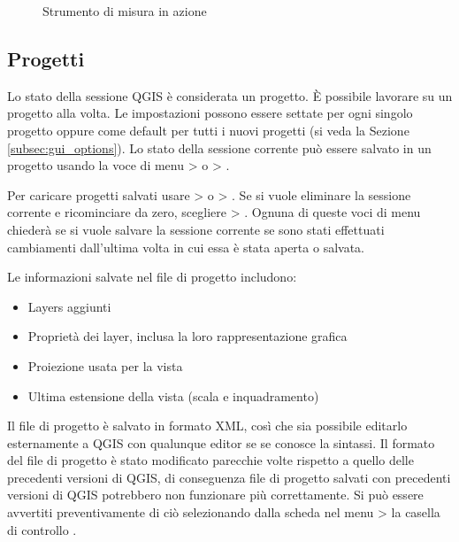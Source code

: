 \begin{figure}[h]
\caption{Strumento di misura in azione \nixcaption} \label{fig:measure}
\centering
   \goodgap
\end{figure}

\subsection{Progetti}\label{sec:projects}

Lo stato della sessione QGIS è considerata un progetto. È possibile lavorare
su un
progetto alla volta. Le impostazioni possono essere settate per ogni singolo
progetto oppure come default per tutti i nuovi progetti (si veda la Sezione
\ref{subsec:gui_options}). Lo stato della sessione corrente può essere salvato
in un progetto usando la voce di menu  >
o  > .

Per caricare progetti salvati usare  >
o  > .
Se si vuole eliminare la sessione corrente e ricominciare da zero, scegliere
 > .
Ognuna di queste voci di menu chiederà se si vuole salvare la sessione
corrente se sono stati effettuati cambiamenti dall'ultima volta in cui essa è
stata aperta o salvata.

Le informazioni salvate nel file di progetto includono:

\begin{itemize}
\item Layers aggiunti
\item Proprietà dei layer, inclusa la loro rappresentazione grafica
\item Proiezione usata per la vista
\item Ultima estensione della vista (scala e inquadramento)
\end{itemize}

Il file di progetto è salvato in formato XML, così che sia possibile editarlo
esternamente a QGIS con qualunque editor se se conosce la sintassi. Il formato
del file di progetto è stato modificato parecchie volte rispetto a quello
delle precedenti versioni di QGIS, di conseguenza file di progetto salvati con
precedenti versioni di QGIS potrebbero non funzionare più correttamente. Si
può essere avvertiti preventivamente di ciò selezionando dalla scheda
 nel menu  >  
la casella di controllo .

